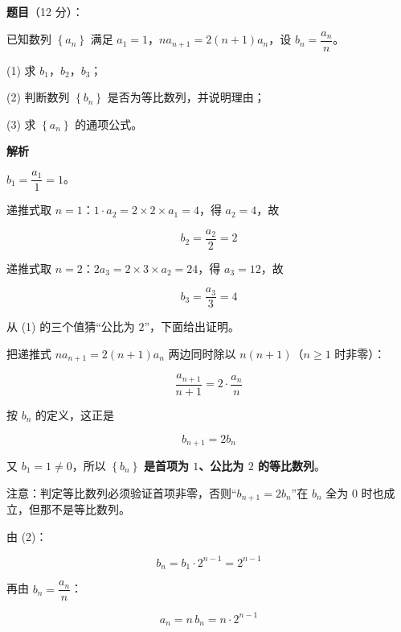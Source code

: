 \begin{answer}

\textbf{题目}（12 分）：

已知数列 $\left\{a_n\right\}$ 满足 $a_1=1$，$na_{n+1}=2(n+1)a_n$，设 $b_n=\dfrac{a_n}n$。

  (1) 求 $b_1$，$b_2$，$b_3$；

  (2) 判断数列 $\left\{b_n\right\}$ 是否为等比数列，并说明理由；

  (3) 求 $\left\{a_n\right\}$ 的通项公式。

\textbf{解析}


$b_1=\dfrac{a_1}1=1$。

递推式取 $n=1$：$1\cdot a_2=2\times2\times a_1=4$，得 $a_2=4$，故

\nopagebreak[4]
\[b_2=\frac{a_2}2=2\]

递推式取 $n=2$：$2a_3=2\times3\times a_2=24$，得 $a_3=12$，故

\nopagebreak[4]
\[b_3=\frac{a_3}3=4\]


从 (1) 的三个值猜“公比为 $2$”，下面给出证明。

把递推式 $na_{n+1}=2(n+1)a_n$ 两边同时除以 $n(n+1)$（$n\ge1$ 时非零）：

\nopagebreak[4]
\[\frac{a_{n+1}}{n+1}=2\cdot\frac{a_n}n\]

按 $b_n$ 的定义，这正是

\nopagebreak[4]
\[b_{n+1}=2b_n\]

又 $b_1=1\ne0$，所以 $\left\{b_n\right\}$ \textbf{是首项为 $1$、公比为 $2$ 的等比数列}。

\begin{gktip}
注意：判定等比数列必须验证首项非零，否则“$b_{n+1}=2b_n$”在 $b_n$ 全为 $0$ 时也成立，但那不是等比数列。
\end{gktip}


由 (2)：

\nopagebreak[4]
\[b_n=b_1\cdot2^{n-1}=2^{n-1}\]

再由 $b_n=\dfrac{a_n}n$：

\nopagebreak[4]
\[a_n=n\,b_n=n\cdot2^{n-1}\]


\end{answer}
